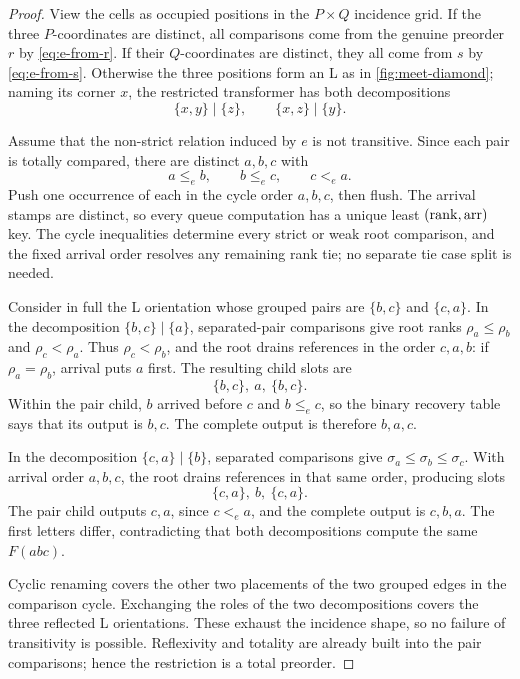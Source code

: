\begin{proof}
View the cells as occupied positions in the \(P\times Q\) incidence grid.  If
the three \(P\)-coordinates are distinct, all comparisons come from the genuine
preorder \(r\) by \autoref{eq:e-from-r}.  If their \(Q\)-coordinates are distinct,
they all come from \(s\) by \autoref{eq:e-from-s}.  Otherwise the three positions
form an L as in \autoref{fig:meet-diamond}; naming its corner \(x\), the restricted
transformer has both decompositions
\begin{equation}
  \{x,y\}\mid\{z\},
  \qquad
  \{x,z\}\mid\{y\}.
  \label{eq:l-decompositions}
\end{equation}

Assume that the non-strict relation induced by \(e\) is not transitive.  Since
each pair is totally compared, there are distinct \(a,b,c\) with
\begin{equation}
  a\le_e b,
  \qquad b\le_e c,
  \qquad c<_e a.
  \label{eq:bad-triple}
\end{equation}
Push one occurrence of each in the cycle order \(a,b,c\), then flush.  The
arrival stamps are distinct, so every queue computation has a unique least
\((\operatorname{rank},\operatorname{arr})\) key.  The cycle inequalities determine every strict or weak
root comparison, and the fixed arrival order resolves any remaining rank tie;
no separate tie case split is needed.

Consider in full the L orientation whose grouped pairs are \(\{b,c\}\) and
\(\{c,a\}\).  In the decomposition
\(\{b,c\}\mid\{a\}\), separated-pair comparisons give root ranks
\(\rho_a\le\rho_b\) and \(\rho_c<\rho_a\).  Thus
\(\rho_c<\rho_b\), and the root drains references in the order
\(c,a,b\): if \(\rho_a=\rho_b\), arrival puts \(a\) first.  The resulting
child slots are
\[
  \{b,c\},\ a,\ \{b,c\}.
\]
Within the pair child, \(b\) arrived before \(c\) and \(b\le_e c\), so the
binary recovery table says that its output is \(b,c\).  The complete output is
therefore \(b,a,c\).

In the decomposition \(\{c,a\}\mid\{b\}\), separated comparisons give
\(\sigma_a\le\sigma_b\le\sigma_c\).  With arrival order \(a,b,c\), the root
drains references in that same order, producing slots
\[
  \{c,a\},\ b,\ \{c,a\}.
\]
The pair child outputs \(c,a\), since \(c<_e a\), and the complete output is
\(c,b,a\).  The first letters differ, contradicting that both decompositions
compute the same \(F(abc)\).

Cyclic renaming covers the other two placements of the two grouped edges in
the comparison cycle.  Exchanging the roles of the two decompositions covers
the three reflected L orientations.  These exhaust the incidence shape, so no
failure of transitivity is possible.  Reflexivity and totality are already
built into the pair comparisons; hence the restriction is a total preorder.
\end{proof}

